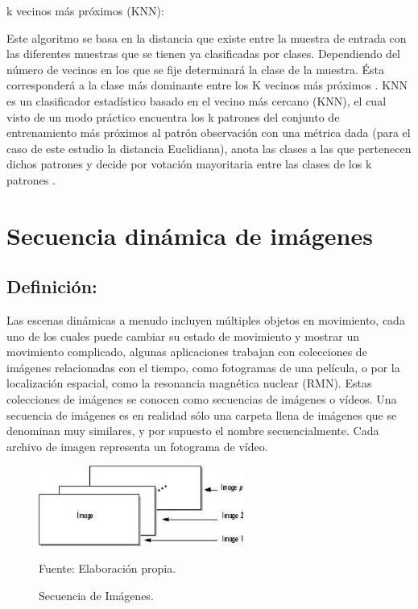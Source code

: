 \begin{enumerate}
{\bf \item k vecinos más próximos (KNN):} \skip 0.1cm
Este algoritmo se basa en la distancia que existe entre la muestra de entrada con las diferentes muestras que se tienen ya clasificadas por clases. Dependiendo del número de vecinos en los que se fije determinará la clase de la muestra. Ésta corresponderá a la clase más dominante entre los K vecinos más próximos \citep{Bartual}. 
\vskip 0.1cm
KNN es un clasificador estadístico basado en el vecino más cercano (KNN), el cual visto de un modo práctico encuentra los k patrones del conjunto de entrenamiento más próximos al patrón observación con una métrica dada (para el caso de este estudio la distancia Euclidiana), anota las clases a las que pertenecen dichos patrones y decide por votación mayoritaria entre las clases de los k patrones \citep{Damian}.
\end{enumerate}

\section{Secuencia dinámica de imágenes}
\subsection{Definición:}
Las escenas dinámicas a menudo incluyen múltiples objetos en movimiento, cada uno de los cuales puede cambiar su estado de movimiento y mostrar un movimiento complicado, algunas aplicaciones trabajan con colecciones de imágenes relacionadas con el tiempo, como fotogramas de una película, o por la localización espacial, como la resonancia magnética nuclear (RMN). Estas colecciones de imágenes se conocen como secuencias de imágenes o vídeos.
\vskip 0.1cm
Una secuencia de imágenes es en realidad sólo una carpeta llena de imágenes que se denominan muy similares, y por supuesto el nombre secuencialmente. Cada archivo de imagen representa un fotograma de vídeo.

\begin{figure}[ht]
\begin{center}
\includegraphics[width=0.6\textwidth]{Imagen25}
\end{center}
\begin{center}
\vskip -0.5cm
\caption{\small{Secuencia de Imágenes.}}
{\small{Fuente: Elaboración propia.}}
\end{center}
\end{figure}


